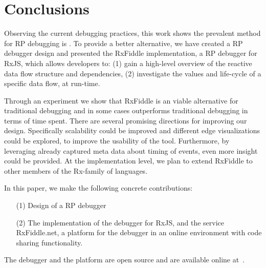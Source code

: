 \section{Conclusions}
Observing the current debugging practices, this work shows the prevalent method for RP debugging is \printfdebugging{}.
To provide a better alternative, we have created a RP debugger design and presented the RxFiddle implementation, a RP debugger for RxJS, which allows developers to: 
(1) gain a high-level overview of the reactive data flow structure and dependencies,
(2) investigate the values and life-cycle of a specific data flow, at run-time.

Through an experiment we show that RxFiddle is an viable alternative for traditional debugging and in some cases outperforms traditional debugging in terms of time spent. There are several promising directions for improving our design.
Specifically scalability could be improved and different edge visualizations could be explored, to improve the usability of the tool. Furthermore, by leveraging already captured meta data about timing of events, even more insight could be provided. At the implementation level, we plan to extend RxFiddle to other members of the Rx-family of languages.

In this paper, we make the following concrete contributions:
\begin{itemize}
\item[(1)] Design of a RP debugger
\item[(2)] The implementation of the debugger for RxJS, and the service RxFiddle.net, a platform for the debugger in an online environment with code sharing functionality.
\end{itemize}

The debugger and the platform are open source and are available online at~\cite{rxfiddle-doi}.
